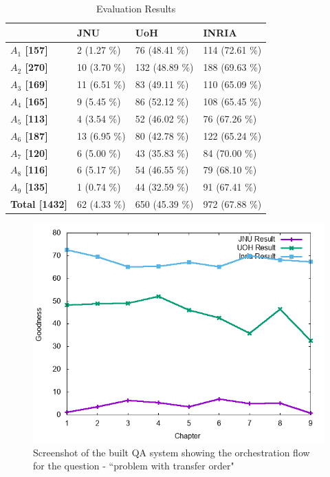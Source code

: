 \documentclass[11pt]{article}
\begin{document}
\begin{table}[h]
\begin{center}
\begin{tabular}{p{1.4cm} | p{1.6cm} | p{1.5cm} | p{1.5cm}}
\hline 
 & \bf JNU & \bf UoH & \bf INRIA \\ 
 \hline
 
\bf $A_1$ [157] &   2 (1.27 \%) &   76 (48.41 \%) &   114 (72.61 \%) \\
\bf $A_2$ [270] &   10 (3.70 \%) &   132 (48.89 \%) &   188 (69.63 \%) \\
\bf $A_3$ [169] &   11 (6.51 \%) &   83 (49.11 \%) &   110 (65.09 \%) \\
\bf $A_4$ [165] &   9 (5.45 \%) &   86 (52.12 \%) &   108 (65.45 \%) \\
\bf $A_5$ [113] &   4 (3.54 \%) &   52 (46.02 \%) &   76 (67.26 \%) \\
\bf $A_6$ [187] &   13 (6.95 \%) &   80 (42.78 \%) &   122 (65.24 \%) \\
\bf $A_7$ [120] &   6 (5.00 \%) &   43 (35.83 \%) &   84 (70.00 \%) \\
\bf $A_8$ [116] &   6 (5.17 \%) &   54 (46.55 \%) &   79 (68.10 \%) \\
\bf $A_9$ [135] &   1 (0.74 \%) &   44 (32.59 \%) &   91 (67.41 \%) \\
\bf Total [1432] &   62 (4.33 \%) &   650 (45.39 \%) &   972 (67.88 \%) \\
 
\hline
\end{tabular}
\end{center}
\caption{\label{font-table} Evaluation Results }
\end{table}


\begin{figure}[!h]
	\center
	\includegraphics[scale=0.34]{images/split.png}
	\caption{\label{screen}Screenshot of the built QA system showing the orchestration flow for the question - ``problem with transfer order"}
\end{figure}
\end{document}
